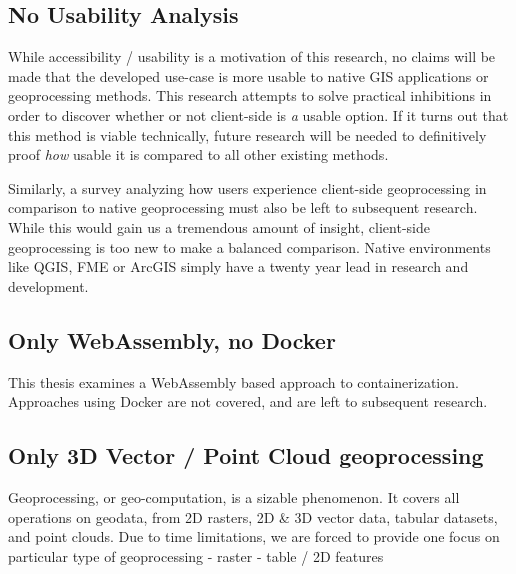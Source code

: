 \subsection*{ No Usability Analysis } %
While accessibility / usability is a motivation of this research, no claims will be made that the developed use-case is more usable to native GIS applications or geoprocessing methods. This research attempts to solve practical inhibitions in order to discover whether or not client-side is \emph{a} usable option. If it turns out that this method is viable technically, future research will be needed to definitively proof \emph{how} usable it is compared to all other existing methods.  


Similarly, a survey analyzing how users experience client-side geoprocessing in comparison to native geoprocessing must also be left to subsequent research. While this would gain us a tremendous amount of insight, client-side geoprocessing is too new to make a balanced comparison. Native environments like QGIS, FME or ArcGIS simply have a twenty year lead in research and development. 



\subsection {Only WebAssembly, no Docker}
This thesis examines a WebAssembly based approach to containerization. Approaches using Docker are not covered, and are left to subsequent research.

\subsection*{ Only 3D Vector / Point Cloud geoprocessing}
Geoprocessing, or geo-computation, is a sizable phenomenon. 
It covers all operations on geodata, from 2D rasters, 2D \& 3D vector data, tabular datasets, and point clouds. 
Due to time limitations, we are forced to provide one focus on particular type of geoprocessing
- raster
- table / 2D features

